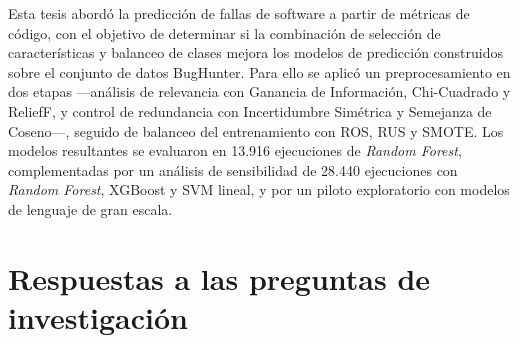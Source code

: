 \fontsize{14}{15}\selectfont
Esta tesis abordó la predicción de fallas de software a partir de métricas de código, con el objetivo de determinar si la combinación de selección de características y balanceo de clases mejora los modelos de predicción construidos sobre el conjunto de datos BugHunter. Para ello se aplicó un preprocesamiento en dos etapas ---análisis de relevancia con Ganancia de Información, Chi-Cuadrado y ReliefF, y control de redundancia con Incertidumbre Simétrica y Semejanza de Coseno---, seguido de balanceo del entrenamiento con ROS, RUS y SMOTE. Los modelos resultantes se evaluaron en 13.916 ejecuciones de \textit{Random Forest}, complementadas por un análisis de sensibilidad de 28.440 ejecuciones con \textit{Random Forest}, XGBoost y SVM lineal, y por un piloto exploratorio con modelos de lenguaje de gran escala.

\section*{Respuestas a las preguntas de investigación}


